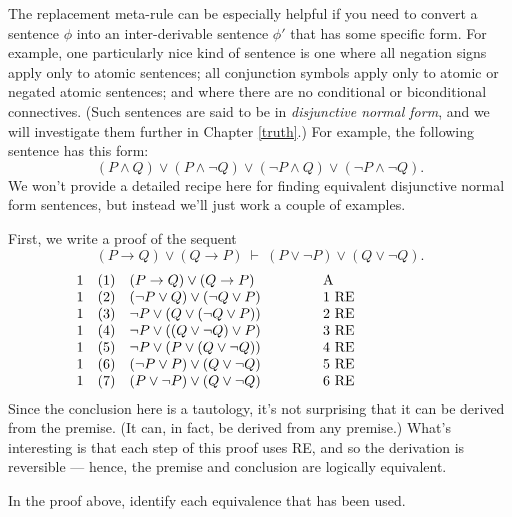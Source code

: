 The replacement meta-rule can be especially helpful if you need to
convert a sentence $\phi$ into an inter-derivable sentence $\phi '$
that has some specific form.  For example, one particularly nice kind
of sentence is one where all negation signs apply only to atomic
sentences; all conjunction symbols apply only to atomic or negated
atomic sentences; and where there are no conditional or biconditional
connectives.  (Such sentences are said to be in \emph{disjunctive
  normal form}, and we will investigate them further in Chapter
\ref{truth}.)  For example, the following sentence has this form:
\[ (P\wedge Q)\vee (P\wedge\neg Q)\vee (\neg P\wedge Q)\vee (\neg
  P\wedge\neg Q) .\] We won't provide a detailed recipe here for
finding equivalent disjunctive normal form sentences, but instead
we'll just work a couple of examples.

First, we write a proof of the sequent
\[ (P\to Q)\vee (Q\to P)\:\vdash\: (P\vee\neg P)\vee (Q\vee\neg Q) .\]
\[ \begin{array}{l l >{$}p{4.5cm}<{$} p{3cm}}
     1     & (1) & (P\to Q)\vee (Q\to P) & A \\
     1    & (2) & (\neg P\vee Q)\vee (\neg Q\vee P) & 1 RE \\
     1     & (3) & \neg P\vee (Q\vee (\neg Q\vee P)) & 2 RE \\
     1     & (4) & \neg P\vee ((Q\vee \neg Q)\vee P) & 3 RE \\
     1     & (5) & \neg P\vee (P\vee (Q\vee\neg Q)) & 4 RE \\
     1     & (6) & (\neg P\vee P)\vee (Q\vee \neg Q) & 5 RE \\
     1 & (7) & (P\vee\neg P)\vee (Q\vee \neg Q) & 6 RE \end{array} \]
 Since the conclusion here is a tautology, it's not surprising that it
 can be derived from the premise.  (It can, in fact, be derived from
 any premise.)  What's interesting is that each step of this proof
 uses RE, and so the derivation is reversible --- hence, the premise
 and conclusion are logically equivalent.

\begin{exercise} In the proof above, identify each equivalence that
  has been used. \end{exercise}
 
